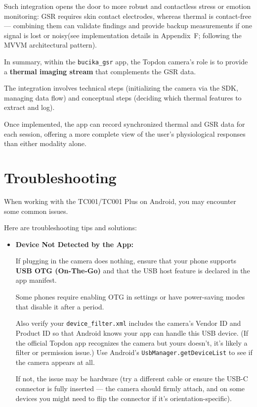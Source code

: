 {Such integration opens the door to more robust and contactless stress or emotion
monitoring: GSR requires skin contact electrodes, whereas thermal is contact-free ---
combining them can validate findings and provide backup measurements if one signal is
lost or noisy(see implementation details in Appendix~F; following the MVVM
architectural pattern).

In summary, within the \texttt{bucika_gsr} app, the Topdon camera's role is to
provide a \textbf{thermal imaging stream}
 that complements the GSR data.

The integration involves technical steps (initializing the camera via the SDK,
managing data flow) and conceptual steps (deciding which thermal features to extract
and log).

Once implemented, the app can record synchronized thermal and GSR data for each
session, offering a more complete view of the user's physiological responses than
either modality alone.

\section{Troubleshooting}

When working with the TC001/TC001 Plus on Android, you may encounter some common
issues.

Here are troubleshooting tips and solutions: \begin{itemize}

\item \textbf{Device Not Detected by the App:}

If plugging in the camera does nothing, ensure that your phone supports \textbf{USB
OTG (On-The-Go)}
 and that the USB host feature is declared in the app manifest.

Some phones require enabling OTG in settings or have power-saving modes that disable
it after a period.

Also verify your \texttt{device_filter.xml} includes the camera's Vendor ID and
Product ID so that Android knows your app can handle this USB device.  (If the
official Topdon app recognizes the camera but yours doesn't, it's likely a filter or
permission issue.) Use Android's \texttt{UsbManager.getDeviceList} to see if the
camera appears at all.

If not, the issue may be hardware (try a different cable or ensure the USB-C
connector is fully inserted --- the camera should firmly attach, and on some devices
you might need to flip the connector if it's orientation-specific).


\end{itemize}}
